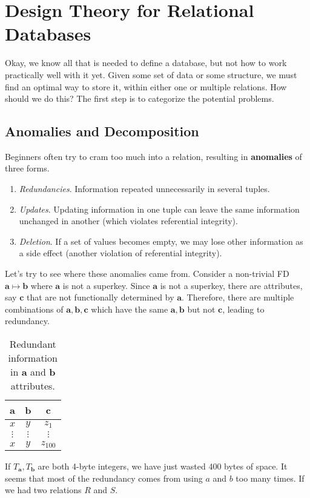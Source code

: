 \section{Design Theory for Relational Databases}
    
  Okay, we know all that is needed to define a database, but not how to work practically well with it yet. Given some set of data or some structure, we must find an optimal way to store it, within either one or multiple relations. How should we do this? The first step is to categorize the potential problems. 

\subsection{Anomalies and Decomposition}
  
  \begin{definition}[Anomaly]
    Beginners often try to cram too much into a relation, resulting in \textbf{anomalies} of three forms. 
    \begin{enumerate}
      \item \textit{Redundancies}. Information repeated unnecessarily in several tuples. 
      \item \textit{Updates}. Updating information in one tuple can leave the same information unchanged in another (which violates referential integrity). 
      \item \textit{Deletion}. If a set of values becomes empty, we may lose other information as a side effect (another violation of referential integrity). 
    \end{enumerate}
  \end{definition}

  \begin{example}[Redundancies]
    Let's try to see where these anomalies came from. Consider a non-trivial FD $\mathbf{a} \mapsto \mathbf{b}$ where $\mathbf{a}$ is not a superkey. Since $\mathbf{a}$ is not a superkey, there are attributes, say $\mathbf{c}$ that are not functionally determined by $\mathbf{a}$. Therefore, there are multiple combinations of $\mathbf{a, b, c}$ which have the same $\mathbf{a, b}$ but not $\mathbf{c}$, leading to redundancy. 

    \begin{table}[H]
      \centering
      \begin{tabular}{|c|c|c|}
        \hline
        \textbf{a} & \textbf{b} & \textbf{c} \\
        \hline
        $x$ & $y$ & $z_1$ \\ 
        $\vdots$ & $\vdots$ & $\vdots$ \\ 
        $x$ & $y$ & $z_{100}$ \\
        \hline
      \end{tabular}
      \caption{Redundant information in \textbf{a} and \textbf{b} attributes. }
      \label{tab:redundant}
    \end{table}
    If $T_{\mathbf{a}}, T_{\mathbf{b}}$ are both 4-byte integers, we have just wasted 400 bytes of space. It seems that most of the redundancy comes from using $a$ and $b$ too many times. If we had two relations $R$ and $S$. 
  \end{example}

